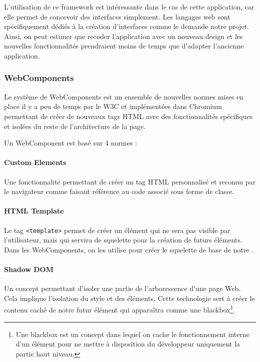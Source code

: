 L'utilisation de ce framework est intéressante dans le cas de cette application, car elle permet de concevoir des interfaces simplement.
Les langages web sont spécifiquement dédiés à la création d'interfaces comme le demande notre projet.
Ainsi, on peut estimer que recoder l'application avec un nouveau design et les nouvelles fonctionnalités prendraient moins de temps que d'adapter l'ancienne application.

\subsubsection{WebComponents}
\label{webcomponents}

Le système de WebComponents est un ensemble de nouvelles normes mises en place il y a peu de temps par le W3C et implémentées dans Chromium permettant de créer de nouveaux tags HTML avec des fonctionnalités spécifiques et isolées du reste de l'architecture de la page.

\clearpage

Un WebComponent est basé sur 4 normes :

\paragraph{Custom Elements} Une fonctionnalité permettant de créer un tag HTML personnalisé et reconnu par le navigateur comme faisant référence au code associé sous forme de classe.

\paragraph{HTML Template} Le tag \texttt{<template>} permet de créer un élément qui ne sera pas visible par l'utilisateur, mais qui servira de squelette pour la création de futurs éléments.
Dans les WebComponents, on les utilise pour créer le squelette de base de notre \component.

\paragraph{Shadow DOM} Un concept permettant d'isoler une partie de l'arborescence d'une page Web.
Cela implique l'isolation du style et des éléments.
Cette technologie sert à créer le contenu caché de notre futur élément qui apparaîtra comme une blackbox\footnote{Une blackbox est un concept dans lequel on cache le fonctionnement interne d'un élément pour ne mettre à disposition du développeur uniquement la partie haut niveau.}.

